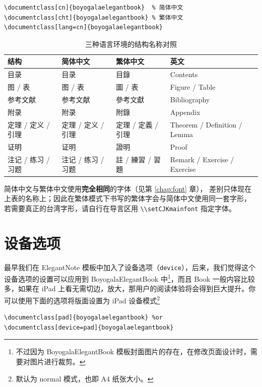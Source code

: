 \documentclass[lang=cn,10pt,scheme=chinese]{boyogalaelegantbook}
\begin{document}
\begin{lstlisting}
\documentclass[cn]{boyogalaelegantbook}  % 简体中文
\documentclass[cht]{boyogalaelegantbook} % 繁体中文
\documentclass[lang=cn]{boyogalaelegantbook}
\end{lstlisting}

\begin{table}[htbp]
  \centering
  \caption{三种语言环境的结构名称对照}
  \label{tab:langs}
  \begin{tabular}{llll}
    \toprule
    结构 & 简体中文 & 繁体中文 & 英文 \\
    \midrule
    目录 & 目录 & 目錄 & Contents \\
    图 / 表 & 图 / 表 & 圖 / 表 & Figure / Table \\
    参考文献 & 参考文献 & 參考文獻 & Bibliography \\
    附录 & 附录 & 附錄 & Appendix \\
    定理 / 定义 / 引理 & 定理 / 定义 / 引理 & 定理 / 定義 / 引理 & Theorem / Definition / Lemma \\
    证明 & 证明 & 證明 & Proof \\
    注记 / 练习 / 习题 & 注记 / 练习 / 习题 & 註 / 練習 / 習題 & Remark / Exercise / Exercise \\
    \bottomrule
  \end{tabular}
\end{table}

\begin{remark}
简体中文与繁体中文使用\textbf{完全相同}的字体（见第 \ref{chap:font} 章），
差别只体现在上表的名称上；因此在繁体模式下书写的繁体字会与简体中文使用同一套字形，
若需要真正的台湾字形，请自行在导言区用 \lstinline{\\setCJKmainfont} 指定字体。
\end{remark}

\section{设备选项}
最早我们在 ElegantNote 模板中加入了设备选项（\lstinline{device}），后来，我们觉得这个设备选项的设置可以应用到 BoyogalaElegantBook 中\footnote{不过因为 BoyogalaElegantBook 模板封面图片的存在，在修改页面设计时，需要对图片进行裁剪。}，而且 Book 一般内容比较多，如果在 iPad 上看无需切边，放大，那用户的阅读体验将会得到巨大提升。你可以使用下面的选项将版面设置为 iPad 设备模式\footnote{默认为 normal 模式，也即 A4 纸张大小。}
\begin{lstlisting}
\documentclass[pad]{boyogalaelegantbook} %or
\documentclass[device=pad]{boyogalaelegantbook}
\end{lstlisting}
\end{document}
